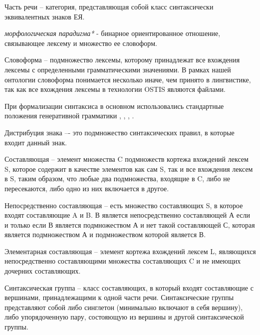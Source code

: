 Часть речи -- категория, представляющая собой класс синтаксически эквивалентных знаков ЕЯ.

\begin{SCn}


\end{SCn}

\textit{морфологическая парадигма*} - бинарное ориентированное отношение, связывающее лексему и множество ее словоформ.

Словоформа -- подмножество лексемы, которому принадлежат все вхождения лексемы с определенными грамматическими значениями. В рамках нашей онтологии словоформа понимается несколько иначе, чем принято в лингвистике, так как все вхождения лексемы в технологии OSTIS являются файлами.

При формализации синтаксиса в основном использовались стандартные положения генеративной грамматики , , , .

Дистрибуция знака –- это подмножество синтаксических правил, в которые входит данный знак.

Составляющая -- элемент множества C подмножеств кортежа вхождений лексем S, которое содержит в качестве элементов как сам S, так и все вхождения лексем в S, таким образом, что любые два подмножества, входящие в C, либо не пересекаются, либо одно из них включается в другое.

Непосредственно составляющая --  есть множество составляющих S, в которое входят составляющие A и B. В является непосредственно составляющей А если и только если В является подмножеством А и нет такой составляющей С, которая является подмножеством А и подмножеством которой является В.

Элементарная составляющая -- элемент кортежа вхождений лексем L, являющихся непосредственно составляющими множества составляющих C и не имеющих дочерних составляющих.

Синтаксическая группа -- класс составляющих, в который входят составляющие с вершинами, принадлежащими к одной части речи. Синтаксические группы представляют собой либо синглетон (минимально включают в себя вершину), либо упорядоченную пару, состояющую из вершины и другой синтаксической группы.

